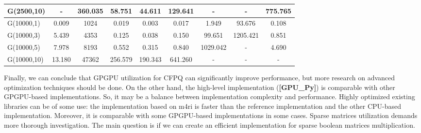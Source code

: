 \begin{table*}
\begin{tabular}{| l | c | c | c | c | c | c | c | c |}
    G(2500,10)             & -       & 360.035           & 58.751  & 44.611         & 129.641 & -                & -        & 775.765 \\
    \hline
    G(10000,1)             & 0.009   & 1024              & 0.019   & 0.003          & 0.017   & 1.949            & 93.676   & 0.108  \\
    G(10000,3)             & 5.439   & 4353              & 0.125   & 0.038          & 0.150   & 99.651           & 1205.421 & 0.851  \\
    G(10000,5)             & 7.978   & 8193              & 0.552   & 0.315          & 0.840   & 1029.042         & -        & 4.690  \\
    G(10000,10)            & 13.180  & 47362             & 256.579 & 190.343        & 641.260 & -                & -        & -      \\

    \hline
  \end{tabular}
\end{table*}


Finally, we can conclude that GPGPU utilization for CFPQ can significantly improve performance, but more research on advanced optimization techniques should be done.
On the other hand, the high-level implementation (\textbf{[GPU\_Py]}) is comparable with other GPGPU-based implementations.
So, it may be a balance between implementation complexity and performance.
Highly optimized existing libraries can be of some use: the implementation based on m4ri is faster than the reference implementation and the other CPU-based implementation.
Moreover, it is comparable with some GPGPU-based implementations in some cases.
Sparse matrices utilization demands more thorough investigation.
The main question is if we can create an efficient implementation for sparse boolean matrices multiplication.
